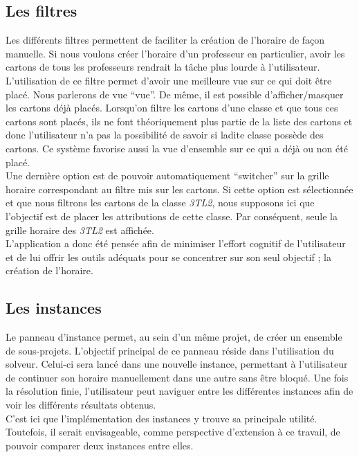 \subsection{Les filtres}
Les différents filtres permettent de faciliter la création de l'horaire de façon manuelle. Si nous voulons créer l'horaire d'un professeur en particulier, avoir les cartons de tous les professeurs rendrait la tâche plus lourde à l'utilisateur. L'utilisation de ce filtre permet d'avoir une meilleure vue sur ce qui doit être placé. Nous parlerons de vue \enquote{vue}.
\newline
\indent
De même, il est possible d'afficher/masquer les cartons déjà placés. Lorsqu'on filtre les cartons d'une classe et que tous ces cartons sont placés, ils ne font théoriquement plus partie de la liste des cartons et donc l'utilisateur n'a pas la possibilité de savoir si ladite classe possède des cartons. Ce système favorise aussi la vue d'ensemble sur ce qui a déjà ou non été placé.\\
\newline
\indent
Une dernière option est de pouvoir automatiquement \enquote{switcher} sur la grille horaire correspondant au filtre mis sur les cartons. Si cette option est sélectionnée et que nous filtrons les cartons de la classe \textit{3TL2}, nous supposons ici que l'objectif est de placer les attributions de cette classe. Par conséquent, seule la grille horaire des \textit{3TL2} est affichée.\\
\newline
\indent
L'application a donc été pensée afin de minimiser l'effort cognitif de l'utilisateur et de lui offrir les outils adéquats pour se concentrer sur son seul objectif ; la création de l'horaire.


\subsection{Les instances}

Le panneau d'instance permet, au sein d'un même projet, de créer un ensemble de 
sous-projets. L'objectif principal de ce panneau réside dans l'utilisation du solveur. Celui-ci sera lancé dans une nouvelle instance, permettant à l'utilisateur de continuer son horaire manuellement dans une autre sans être bloqué. Une fois la résolution finie, l'utilisateur peut naviguer entre les différentes instances afin de voir les différents résultats obtenus. \\
\newline
\indent
C'est ici que l'implémentation des instances y trouve sa principale utilité. Toutefois, il serait envisageable, comme perspective d'extension à ce travail, de pouvoir comparer deux instances entre elles.\\
\newline
\indent

